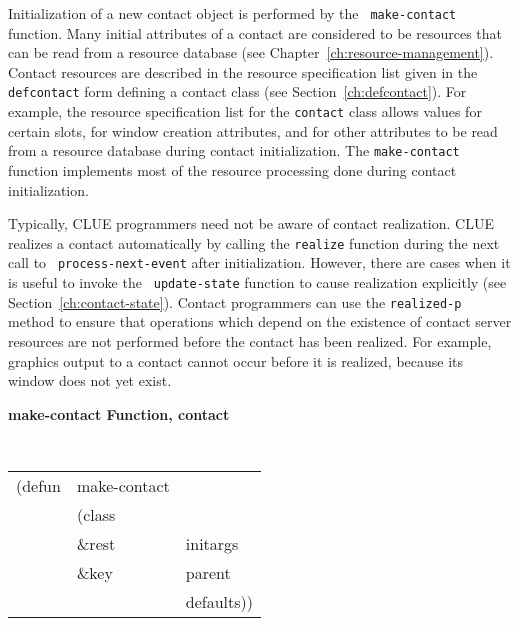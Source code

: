 \documentclass[twoside]{book}
\begin{document}
\begin{sloppy}
Initialization of a new
contact object is performed by the {\tt
make-contact} function.
Many initial attributes of a contact are considered to be
resources that can be read from a resource database
(see Chapter~\ref{ch:resource-management}).
Contact resources are described in the resource specification list given in the
{\tt defcontact} form defining a contact class (see
Section~\ref{ch:defcontact}). 
For example, the resource specification list for the {\tt contact} class allows values for
certain slots, for window creation attributes, and for other
attributes to be read from a resource database during contact
initialization.
The {\tt make-contact} function implements most of the resource processing done during
contact initialization\footnotemark{}. 

Typically, CLUE programmers need not be aware of contact realization. CLUE
realizes a contact automatically by calling the {\tt realize}
function during the next call to {\tt
process-next-event} after initialization.
However, there are cases when it is useful to invoke the {\tt
update-state} function to cause realization
explicitly (see Section~\ref{ch:contact-state}). Contact programmers can use
the {\tt realized-p} method to ensure that operations
which depend on the existence of contact server resources are not performed
before the contact has been realized. For example, graphics output to a contact
cannot occur before it is realized, because its window does not yet exist.

{\large {\bf make-contact \hfill Function, contact}}
\begin{flushright} \parbox[t]{6.125in}{
\tt
\begin{tabular}{lll}
\raggedright
(defun & make-contact & \\
& (class\\
& \&rest & initargs\\
& \&key & parent\\
&       & defaults))
\end{tabular}
\rm

}
\end{flushright}
\end{sloppy}
\end{document}
